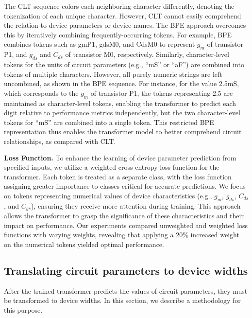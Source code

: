 \noindent
The CLT sequence colors each neighboring character differently, denoting the tokenization of each unique character. However, CLT cannot easily comprehend the relation to device parameters or device names. The BPE approach overcomes this by iteratively combining frequently-occurring tokens. For example, BPE combines tokens such as
gmP1, gdsM0, and CdsM0 to represent $g_m$ of transistor P1, and $g_{ds}$ and $C_{ds}$ of transistor M0, respectively. Similarly, character-level tokens for the units of circuit parameters (e.g., ``mS'' or ``aF'') are combined into tokens of multiple characters. However, all purely numeric strings are left uncombined, as shown in the BPE sequence. For instance, for the value 2.5mS, which corresponds to the $g_m$ of transistor P1, the tokens representing 2.5 are maintained as character-level tokens, enabling the transformer to predict each digit relative to performance metrics independently, but the two character-level tokens for ``mS'' are combined into a single token. This restricted BPE representation thus enables the transformer model to better comprehend circuit relationships, as compared with CLT.





\noindent
\textbf{Loss Function.}
To enhance the learning of device parameter prediction from specified inputs, we utilize a weighted cross-entropy loss function for the transformer. Each token is treated as a separate class, with the loss function assigning greater importance to classes critical for accurate predictions. We focus on tokens representing numerical values of device characteristics (e.g., $g_m$, $g_{ds}$, $C_{ds}$, and $C_{gs}$), ensuring they receive more attention during training. This approach allows the transformer to grasp the significance of these characteristics and their impact on performance. Our experiments compared unweighted and weighted loss functions with varying weights, revealing that applying a 20\% increased weight on the numerical tokens yielded optimal performance.


\vspace{-0.02cm}
\subsection{Translating circuit parameters to device widths}
\label{sec:precomputedLUTs}

\noindent
After the trained transformer predicts the values of circuit parameters, they must be transformed to device widths. 
In this section, we describe a methodology 
for this purpose.

